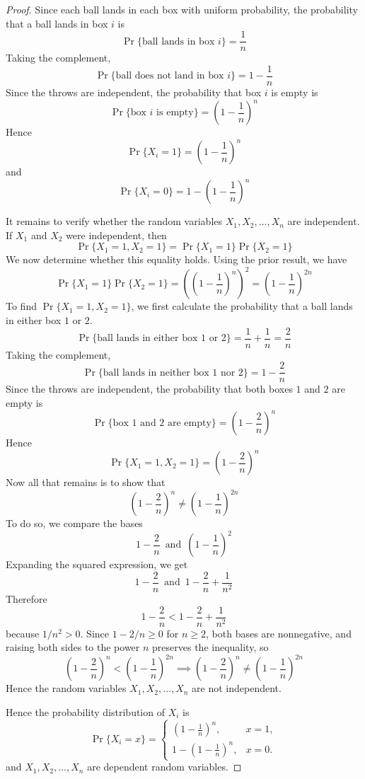 \documentclass{article}
\begin{document}
\begin{proof}
    Since each ball lands in each box with uniform probability, the probability that a ball lands in box $i$ is
    \[
    \Pr\{\text{ball lands in box } i\} = \frac{1}{n}
    \]
    Taking the complement,
    \[
    \Pr\{\text{ball does not land in box } i\} = 1 - \frac{1}{n}
    \]
    Since the throws are independent, the probability that box $i$ is empty is 
    \[
    \Pr\{\text{box } i \text{ is empty}\} = \left(1 - \frac{1}{n}\right)^n
    \]
    Hence
    \[
    \Pr\{X_i = 1\} = \left(1 - \frac{1}{n}\right)^n
    \]
    and 
    \[
    \Pr\{X_i = 0\} = 1 - \left(1 - \frac{1}{n}\right)^n
    \]

    \medskip

    It remains to verify whether the random variables $X_1, X_2, \dots, X_n$ are independent. If $X_1$ and $X_2$ 
    were independent, then
    \[
    \Pr\{X_1 = 1, X_2 = 1\} = \Pr\{X_1 = 1\}\Pr\{X_2 = 1\}
    \]
    We now determine whether this equality holds. Using the prior result, we have
    \[
    \Pr\{X_1 = 1\}\Pr\{X_2 = 1\} = \left(\left(1 - \frac{1}{n}\right)^n\right)^2 
    = \left(1 - \frac{1}{n}\right)^{2n}
    \]
    To find $\Pr\{X_1 = 1, X_2 = 1\}$, we first calculate the probability that a ball 
    lands in either box $1$ or $2$.
    \[
    \Pr\{\text{ball lands in either box } 1 \text{ or } 2\} = \frac{1}{n} + \frac{1}{n} = \frac{2}{n}
    \]
    Taking the complement,
    \[
    \Pr\{\text{ball lands in neither box } 1 \text{ nor } 2\} = 1 - \frac{2}{n}
    \]
    Since the throws are independent, the probability that both boxes $1$ and $2$ are 
    empty is
    \[
    \Pr\{\text{box } 1 \text{ and } 2 \text{ are empty}\} = \left(1 - \frac{2}{n}\right)^n
    \]
    Hence
    \[
    \Pr\{X_1 = 1, X_2 = 1\} = \left(1 - \frac{2}{n}\right)^n
    \]
    Now all that remains is to show that
    \[
    \left(1 - \frac{2}{n}\right)^n \neq \left(1 - \frac{1}{n}\right)^{2n}
    \]
    To do so, we compare the bases 
    \[
    1 - \frac{2}{n} \, \text{ and } \, \left(1 - \frac{1}{n}\right)^2
    \]
    Expanding the squared expression, we get 
    \[
    1 - \frac{2}{n} \, \text{ and } \, 1 - \frac{2}{n} + \frac{1}{n^2}
    \]
    Therefore
    \[
    1 - \frac{2}{n} < 1 - \frac{2}{n} + \frac{1}{n^2}
    \]
    because $1/n^2 > 0$. Since $1 - 2/n \geq 0$ for $n \geq 2$, both bases are nonnegative, and raising 
    both sides to the power $n$ preserves the inequality, so
    \[
    \left(1 - \frac{2}{n}\right)^n < \left(1 - \frac{1}{n}\right)^{2n} \implies 
    \left(1 - \frac{2}{n}\right)^n \neq \left(1 - \frac{1}{n}\right)^{2n}
    \]
    Hence the random variables $X_1, X_2, \dots, X_n$ are not independent.

    \medskip

    Hence the probability distribution of $X_i$ is
    \[
    \Pr\{X_i = x\} =
    \begin{cases}
    \left(1 - \frac{1}{n}\right)^n, & x = 1, \\[6pt]
    1 - \left(1 - \frac{1}{n}\right)^n, & x = 0.
    \end{cases}
    \]
    and $X_1, X_2, \dots, X_n$ are dependent random variables.
\end{proof}
\end{document}
